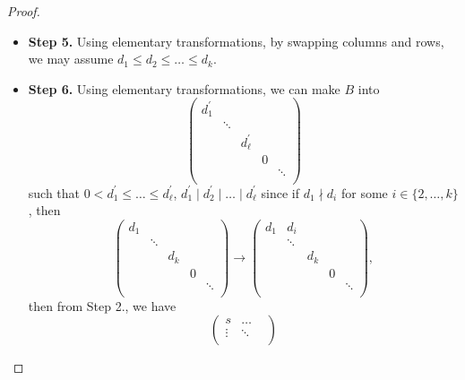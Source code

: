 \begin{proof}
\begin{itemize}
		\item \textbf{Step 5.} Using elementary transformations, by swapping columns and rows, we may assume \(d_1 \leq d_2 \leq \dots \leq  d_{k}  \).
		\item \textbf{Step 6.} Using elementary transformations, we can make \(B\) into
		      \[
			      \begin{pmatrix}
				      d_1^\prime &        &                  &   &        \\
				                 & \ddots &                  &   &        \\
				                 &        & d_{\ell }^\prime &   &        \\
				                 &        &                  & 0 &        \\
				                 &        &                  &   & \ddots \\
			      \end{pmatrix}
		      \]
		      such that \(0< d_1^\prime \leq \dots \leq d_{\ell }^\prime\), \(d_1^\prime \mid d_2^\prime \mid \dots \mid d_{\ell }^\prime\) since if \(d_1\nmid d_{i} \) for some \(i\in \{2, \dots , k \}\), then
		      \[
			      \begin{pmatrix}
				      d_1 &        &       &   &        \\
				          & \ddots &       &   &        \\
				          &        & d_{k} &   &        \\
				          &        &       & 0 &        \\
				          &        &       &   & \ddots \\
			      \end{pmatrix}\to \begin{pmatrix}
				      d_1 & d_{i}  &       &   &        \\
				          & \ddots &       &   &        \\
				          &        & d_{k} &   &        \\
				          &        &       & 0 &        \\
				          &        &       &   & \ddots \\
			      \end{pmatrix},
		      \]
		      then from Step 2., we have
		      \[
			      \begin{pmatrix}
				      s      & \dots  & \\
				      \vdots & \ddots   \\
			      \end{pmatrix}
\]
\end{itemize}
\end{proof}
